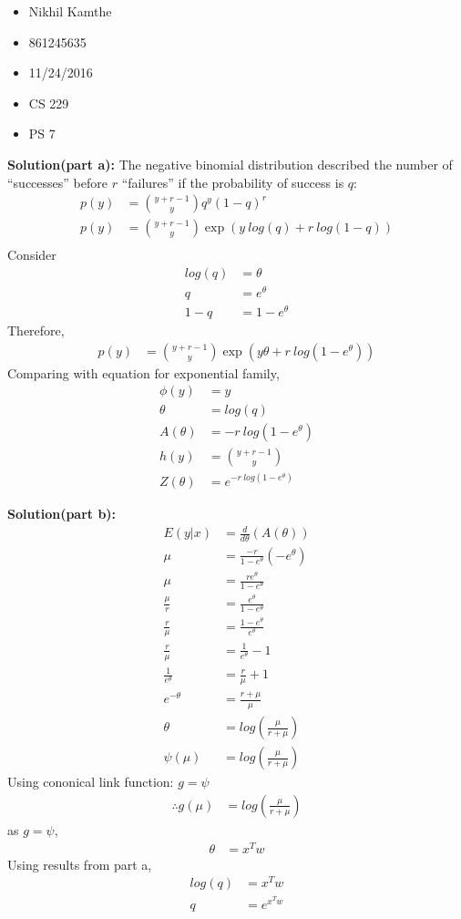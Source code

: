 \documentclass[10pt]{article}
\begin{document}
\begin{itemize}
	\item Nikhil Kamthe
	\item 861245635
	\item 11/24/2016
	\item CS 229
	\item PS 7
\end{itemize}
\hrulefill

\textbf{Solution(part a):} The negative binomial distribution described the number of “successes” before $r$ “failures” if the probability of success is $q$:
\begin{align*}
p(y) &= {y+r-1 \choose y}q^y (1-q)^r\\
p(y) &= {y+r-1 \choose y} \exp{(y~log(q) + r~log(1-q))}\\
\end{align*}
Consider
\begin{align*}
log(q) &= \theta\\
q &= e^{\theta}\\
1-q &= 1-e^{\theta}
\end{align*}
Therefore,
\begin{align*}
p(y) &= {y+r-1 \choose y} \exp{(y\theta + r~log(1-e^{\theta}))}
\end{align*}
Comparing with equation for exponential family,
\begin{align*}
\phi(y) &= y\\
\theta &= log(q)\\
A(\theta) &= -r~log(1-e^{\theta})\\
h(y) &= {y+r-1 \choose y}\\
Z(\theta) &= e^{-r~log(1-e^{\theta})}
\end{align*}

\newpage
\textbf{Solution(part b):}
\begin{align*}
E(y|x) &= \frac{d}{d\theta}(A(\theta))\\
\mu &= \frac{-r}{1-e^{\theta}}(-e^{\theta})\\
\mu &= \frac{re^{\theta}}{1-e^\theta}\\
\frac{\mu}{r} &= \frac{e^{\theta}}{1-e^\theta}\\
\frac{r}{\mu} &= \frac{1-e^\theta}{e^{\theta}}\\
\frac{r}{\mu} &= \frac{1}{e^{\theta}}-1\\
\frac{1}{e^{\theta}} &= \frac{r}{\mu} + 1\\
e^{-\theta} &= \frac{r+\mu}{\mu}\\
\theta &= log(\frac{\mu}{r+\mu})\\
\psi(\mu) &= log(\frac{\mu}{r+\mu})
\end{align*}
Using cononical link function: $g=\psi$
\begin{align*}
\therefore g(\mu) &= log(\frac{\mu}{r+\mu})
\end{align*}
as $g=\psi$,
\begin{align*}
\theta &= x^Tw
\end{align*}
Using results from part a,
\begin{align*}
log(q) &= x^Tw\\
q &= e^{x^Tw}
\end{align*}
\end{document}
